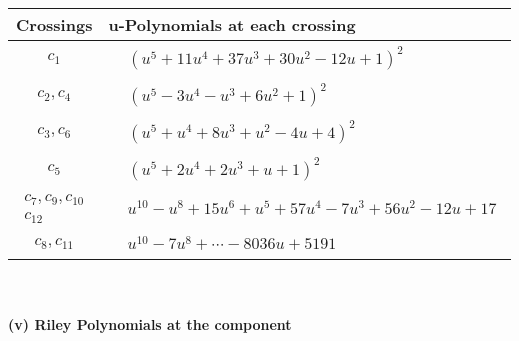 \documentclass[1p]{elsarticle_modified}
\theoremstyle{definition}
\begin{document}
\begin{tabular}{m{50pt}|m{274pt}}
Crossings & \hspace{64pt}u-Polynomials at each crossing \\
\hline $$\begin{aligned}c_{1}\end{aligned}$$&$\begin{aligned}
&(u^5+11 u^4+37 u^3+30 u^2-12 u+1)^2
\end{aligned}$\\
\hline $$\begin{aligned}c_{2},c_{4}\end{aligned}$$&$\begin{aligned}
&(u^5-3 u^4- u^3+6 u^2+1)^2
\end{aligned}$\\
\hline $$\begin{aligned}c_{3},c_{6}\end{aligned}$$&$\begin{aligned}
&(u^5+u^4+8 u^3+u^2-4 u+4)^2
\end{aligned}$\\
\hline $$\begin{aligned}c_{5}\end{aligned}$$&$\begin{aligned}
&(u^5+2 u^4+2 u^3+u+1)^2
\end{aligned}$\\
\hline $$\begin{aligned}c_{7},c_{9},c_{10}\\c_{12}\end{aligned}$$&$\begin{aligned}
&u^{10}- u^8+15 u^6+u^5+57 u^4-7 u^3+56 u^2-12 u+17
\end{aligned}$\\
\hline $$\begin{aligned}c_{8},c_{11}\end{aligned}$$&$\begin{aligned}
&u^{10}-7 u^8+\cdots-8036 u+5191
\end{aligned}$\\
\hline
\end{tabular}\\~\\
\newpage\renewcommand{\arraystretch}{1}
\flushleft \textbf{(v) Riley Polynomials at the component}\newline \\
\end{document}
